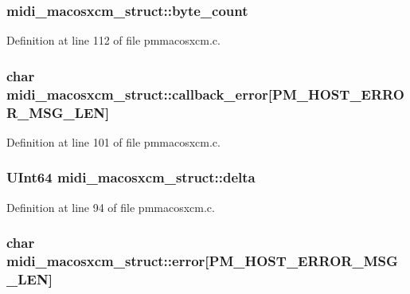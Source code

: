 \subsubsection[{\texorpdfstring{byte\+\_\+count}{byte_count}}]{ midi\+\_\+macosxcm\+\_\+struct\+::byte\+\_\+count}\hypertarget{structmidi__macosxcm__struct_aaa63b528bc4edd457c6846205effa018}{}\label{structmidi__macosxcm__struct_aaa63b528bc4edd457c6846205effa018}


Definition at line 112 of file pmmacosxcm.\+c.

\subsubsection[{\texorpdfstring{callback\+\_\+error}{callback_error}}]{\setlength{\rightskip}{0pt plus 5cm}char midi\+\_\+macosxcm\+\_\+struct\+::callback\+\_\+error\mbox{[}{\bf P\+M\+\_\+\+H\+O\+S\+T\+\_\+\+E\+R\+R\+O\+R\+\_\+\+M\+S\+G\+\_\+\+L\+EN}\mbox{]}}\hypertarget{structmidi__macosxcm__struct_aafbd8d732bba6ec5ca7b95ac4965f60f}{}\label{structmidi__macosxcm__struct_aafbd8d732bba6ec5ca7b95ac4965f60f}


Definition at line 101 of file pmmacosxcm.\+c.

\subsubsection[{\texorpdfstring{delta}{delta}}]{\setlength{\rightskip}{0pt plus 5cm}U\+Int64 midi\+\_\+macosxcm\+\_\+struct\+::delta}\hypertarget{structmidi__macosxcm__struct_a1527198c35538ef24e96c65380ca0108}{}\label{structmidi__macosxcm__struct_a1527198c35538ef24e96c65380ca0108}


Definition at line 94 of file pmmacosxcm.\+c.

\subsubsection[{\texorpdfstring{error}{error}}]{\setlength{\rightskip}{0pt plus 5cm}char midi\+\_\+macosxcm\+\_\+struct\+::error\mbox{[}{\bf P\+M\+\_\+\+H\+O\+S\+T\+\_\+\+E\+R\+R\+O\+R\+\_\+\+M\+S\+G\+\_\+\+L\+EN}\mbox{]}}\hypertarget{structmidi__macosxcm__struct_a3f02ae6688373ea4ed28a69129453a7e}{}\label{structmidi__macosxcm__struct_a3f02ae6688373ea4ed28a69129453a7e}


